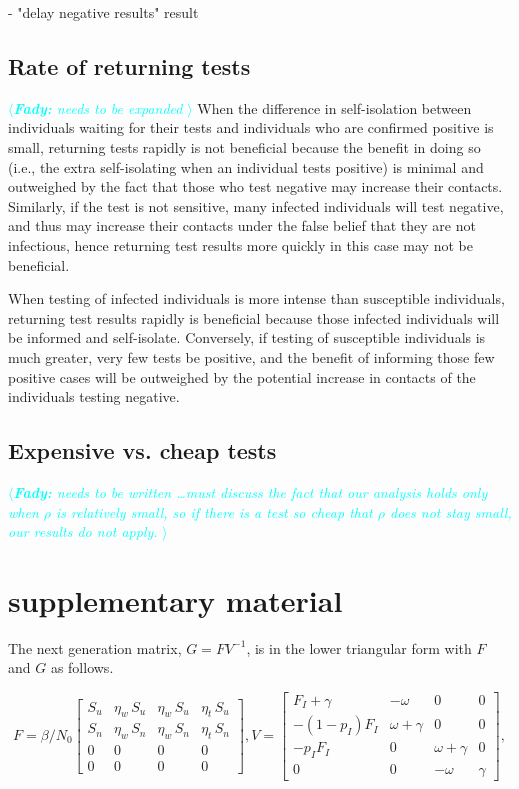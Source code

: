 \documentclass{article}
\newcommand{\fady}[1]{\textcolor{cyan}{$\langle${\slshape{\bfseries Fady:} #1 }$\rangle$}}
\theoremstyle{definition} %
\begin{document}
- "delay negative results" result

\subsection{Rate of returning tests}
\fady{needs to be expanded}
When the difference in self-isolation between individuals waiting for their tests and individuals who are confirmed positive is small, returning tests rapidly is not beneficial because the benefit in doing so (i.e., the extra self-isolating when an individual tests positive) is minimal and outweighed by the fact that those who test negative may increase their contacts. Similarly, if the test is not sensitive, many infected individuals will test negative, and thus may increase their contacts under the false belief that they are not infectious, hence returning test results more quickly in this case may not be beneficial. 

When testing of infected individuals is more intense than susceptible individuals, returning test results rapidly is beneficial because those infected individuals will be informed and self-isolate. Conversely, if testing of susceptible individuals is much greater, very few tests be positive, and the benefit of informing those few positive cases will be outweighed by the potential increase in contacts of the individuals testing negative. 

\subsection{Expensive vs. cheap tests}
\fady{needs to be written \dots must discuss the fact that our analysis holds only when $\rho$ is relatively small, so if there is a test so cheap that $\rho$ does not stay small, our results do not apply.}




\section{supplementary material}

The next generation matrix, $G = F V^{-1}$, is in the lower triangular form with $F$ and $G$ as follows.


\begin{equation}\label{FV}
F= \beta/N_0 \left[ \begin {array}{cccc} 
S_u&\eta_w\,S_u&\eta_w\,S_u&\eta_t\,S_u\\
S_n&\eta_w\,S_n&\eta_w\,S_n&\eta_t\,S_n\\ 
0&0&0&0\\
0&0&0&0
 \end {array} \right],
 V=
 \left[ \begin {array}{cccc}  
F_I+\gamma&-\omega&0&0\\
-(1-p_I)F_I&\omega+\gamma&0&0\\
-p_I F_I&0&\omega+\gamma&0\\
0&0&-\omega&\gamma
\end {array} \right],
\end{equation}
\end{document}
